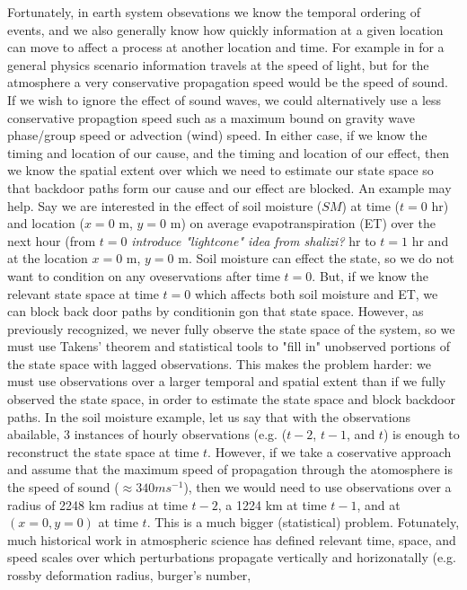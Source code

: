 \documentclass[12pt]{article}
\begin{document}
Fortunately, in earth system obsevations we know the temporal
ordering of events, and we also generally know how quickly
information at a given location can move to affect a process at
another location and time. For example in for a general physics
scenario information travels at the speed of light, but for the
atmosphere a very conservative propagation speed would be the
speed of sound. If we wish to ignore the effect of sound waves, we
could alternatively use a less conservative propagtion speed such
as a maximum bound on gravity wave phase/group speed or advection
(wind) speed. In either case, if we know the timing and location
of our cause, and the timing and location of our effect, then we
know the spatial extent over which we need to estimate our state
space so that backdoor paths form our cause and our effect are
blocked. An example may help. Say we are interested in the effect
of soil moisture (\(SM\)) at time (\(t=0\) hr) and location (\(x=0\) m,
\(y=0\) m) on average evapotranspiration (ET) over the next hour
(from \(t=0\) \emph{introduce "lightcone" idea from shalizi?} hr to \(t=1\)
hr and at the location \(x=0\) m, \(y = 0\) m. Soil moisture can
effect the state, so we do not want to condition on any
oveservations after time \(t=0\). But, if we know the relevant state
space at time \(t=0\) which affects both soil moisture and ET, we
can block back door paths by conditionin gon that state space.
However, as previously recognized, we never fully observe the
state space of the system, so we must use Takens' theorem and
statistical tools to "fill in" unobserved portions of the state
space with lagged observations. This makes the problem harder: we
must use observations over a larger temporal and spatial extent
than if we fully observed the state space, in order to estimate
the state space and block backdoor paths. In the soil moisture
example, let us say that with the observations abailable, 3
instances of hourly observations (e.g. (\(t-2\), \(t-1\), and \(t\)) is
enough to reconstruct the state space at time \(t\).  However, if we
take a coservative approach and assume that the maximum speed of
propagation through the atomosphere is the speed of sound
(\(\approx 340 m s^{-1}\)), then we would need to use observations
over a radius of 2248 km radius at time \(t-2\), a 1224 km at time
\(t-1\), and at \((x=0, y=0)\) at time \(t\). This is a much bigger
(statistical) problem. Fotunately, much historical work in
atmospheric science has defined relevant time, space, and speed
scales over which perturbations propagate vertically and
horizonatally (e.g. rossby deformation radius, burger's number,
\end{document}
